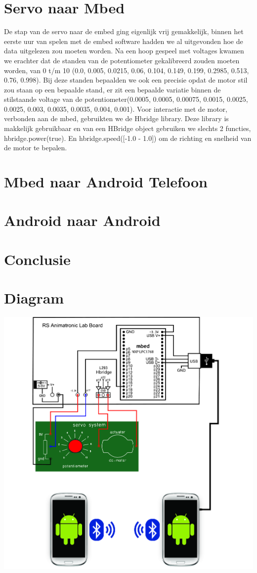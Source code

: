 \documentclass[pdftex,12pt,a4paper]{article}
\begin{document}

\section{Servo naar Mbed}
De stap van de servo naar de embed ging eigenlijk vrij gemakkelijk, binnen het eerste uur van spelen met de embed software hadden we al uitgevonden hoe de data uitgelezen zou moeten worden. Na een hoop gespeel met voltages kwamen we erachter dat de standen van de potentiometer gekalibreerd zouden moeten worden, van 0 t/m 10 (0.0, 0.005, 0.0215, 0.06, 0.104, 0.149, 0.199, 0.2985, 0.513, 0.76, 0.998).
Bij deze standen bepaalden we ook een precisie opdat de motor stil zou staan op een bepaalde stand, er zit een bepaalde variatie binnen de stilstaande voltage van de potentiometer(0.0005, 0.0005, 0.00075, 0.0015, 0.0025, 0.0025, 0.003, 0.0035, 0.0035, 0.004, 0.001).
Voor interactie met de motor, verbonden aan de mbed, gebruikten we de Hbridge library. Deze library is makkelijk gebruikbaar en van een HBridge object gebruiken we slechts 2 functies, hbridge.power(true). En hbridge.speed([-1.0 - 1.0]) om de richting en snelheid van de motor te bepalen.


\section{Mbed naar Android Telefoon}
\section{Android naar Android}
\section{Conclusie}
\section{Diagram}
\includegraphics[width=1\textwidth]{./diagram.jpg}\\
\end{document}
